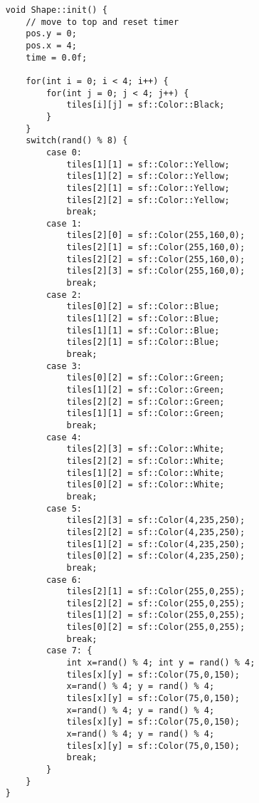 \documentclass[11pt]{amsart}
\begin{document}
\begin{verbatim}
	void Shape::init() {
	    // move to top and reset timer
	    pos.y = 0;
	    pos.x = 4;
	    time = 0.0f;

	    for(int i = 0; i < 4; i++) {
	        for(int j = 0; j < 4; j++) {
	            tiles[i][j] = sf::Color::Black;
	        }
	    }
	    switch(rand() % 8) {
	        case 0:
	            tiles[1][1] = sf::Color::Yellow;
	            tiles[1][2] = sf::Color::Yellow;
	            tiles[2][1] = sf::Color::Yellow;
	            tiles[2][2] = sf::Color::Yellow;
	            break;
	        case 1:
	            tiles[2][0] = sf::Color(255,160,0);
	            tiles[2][1] = sf::Color(255,160,0);
	            tiles[2][2] = sf::Color(255,160,0);
	            tiles[2][3] = sf::Color(255,160,0);
	            break;
	        case 2:
	            tiles[0][2] = sf::Color::Blue;
	            tiles[1][2] = sf::Color::Blue;
	            tiles[1][1] = sf::Color::Blue;
	            tiles[2][1] = sf::Color::Blue;
	            break;
	        case 3:
	            tiles[0][2] = sf::Color::Green;
	            tiles[1][2] = sf::Color::Green;
	            tiles[2][2] = sf::Color::Green;
	            tiles[1][1] = sf::Color::Green;
	            break;
	        case 4:
	            tiles[2][3] = sf::Color::White;
	            tiles[2][2] = sf::Color::White;
	            tiles[1][2] = sf::Color::White;
	            tiles[0][2] = sf::Color::White;
	            break;
	        case 5:
	            tiles[2][3] = sf::Color(4,235,250);
	            tiles[2][2] = sf::Color(4,235,250);
	            tiles[1][2] = sf::Color(4,235,250);
	            tiles[0][2] = sf::Color(4,235,250);
	            break;
	        case 6:
	            tiles[2][1] = sf::Color(255,0,255);
	            tiles[2][2] = sf::Color(255,0,255);
	            tiles[1][2] = sf::Color(255,0,255);
	            tiles[0][2] = sf::Color(255,0,255);
	            break;
	        case 7: {
	            int x=rand() % 4; int y = rand() % 4;
	            tiles[x][y] = sf::Color(75,0,150);
	            x=rand() % 4; y = rand() % 4;
	            tiles[x][y] = sf::Color(75,0,150);
	            x=rand() % 4; y = rand() % 4;
	            tiles[x][y] = sf::Color(75,0,150);
	            x=rand() % 4; y = rand() % 4;
	            tiles[x][y] = sf::Color(75,0,150);
	            break;
	        }
	    }
	}


\end{verbatim}
\end{document}

